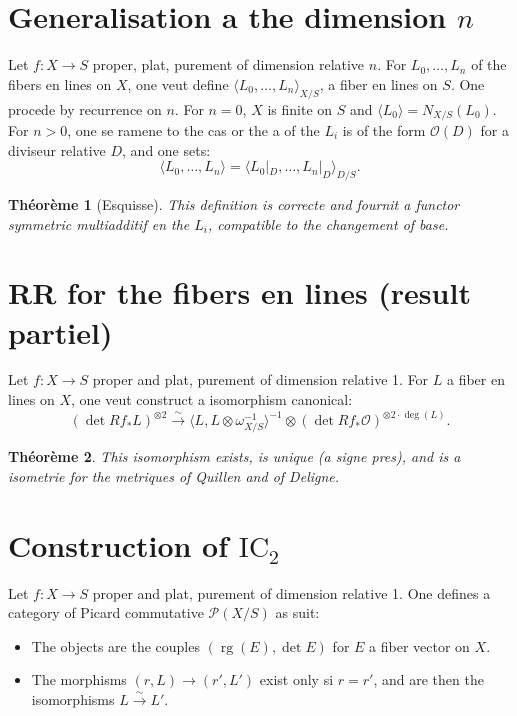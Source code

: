 \documentclass[11pt,a4paper]{article}
\theoremstyle{plain}
\newtheorem{theorem}{Th\'eor\`eme}[section]
\theoremstyle{definition}
\DeclareMathOperator{\rg}{rg}
\newcommand{\IC}{\mathrm{IC}}
\newcommand{\cO}{\mathcal{O}}
\newcommand{\cP}{\mathcal{P}}
\begin{document}
\section{Generalisation a the dimension $n$}

Let $f: X \to S$ proper, plat, purement of dimension relative $n$. For $L_0, \ldots, L_n$ of the fibers en lines on $X$, one veut define $\langle L_0, \ldots, L_n \rangle_{X/S}$, a fiber en lines on $S$. One procede by recurrence on $n$. For $n = 0$, $X$ is finite on $S$ and $\langle L_0 \rangle = N_{X/S}(L_0)$. For $n > 0$, one se ramene to the cas or the a of the $L_i$ is of the form $\cO(D)$ for a diviseur relative $D$, and one sets:
\begin{equation}
\langle L_0, \ldots, L_n \rangle = \langle L_0|_D, \ldots, L_n|_D \rangle_{D/S}.
\end{equation}

\begin{theorem}[Esquisse]
This definition is correcte and fournit a functor symmetric multiadditif en the $L_i$, compatible to the changement of base.
\end{theorem}

\section{RR for the fibers en lines (result partiel)}

Let $f: X \to S$ proper and plat, purement of dimension relative 1. For $L$ a fiber en lines on $X$, one veut construct a isomorphism canonical:
\begin{equation}
(\det Rf_* L)^{\otimes 2} \xrightarrow{\sim} \langle L, L \otimes \omega_{X/S}^{-1} \rangle^{-1} \otimes (\det Rf_* \cO)^{\otimes 2 \cdot \deg(L)}.
\end{equation}

\begin{theorem}
This isomorphism exists, is unique (a signe pres), and is a isometrie for the metriques of Quillen and of Deligne.
\end{theorem}

\section{Construction of $\IC_2$}

Let $f: X \to S$ proper and plat, purement of dimension relative 1. One defines a category of Picard commutative $\cP(X/S)$ as suit:
\begin{itemize}
\item The objects are the couples $(\rg(E), \det E)$ for $E$ a fiber vector on $X$.
\item The morphisms $(r, L) \to (r', L')$ exist only si $r = r'$, and are then the isomorphisms $L \xrightarrow{\sim} L'$.
\end{itemize}
\end{document}
